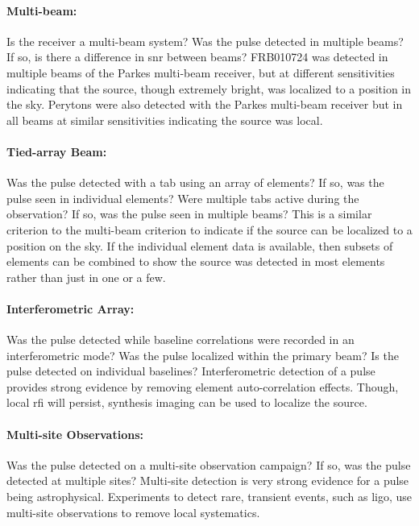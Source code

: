 \documentclass[a4paper,fleqn,usenatbib]{mnras}
\begin{document}
\paragraph{Multi-beam:}

Is the receiver a multi-beam system? Was the pulse detected in multiple beams?
If so, is there a difference in \gls{snr} between beams? FRB010724
\citep{2007Sci...318..777L} was detected in multiple beams of the Parkes
multi-beam receiver, but at different sensitivities indicating that the source,
though extremely bright, was localized to a position in the sky. Perytons were
also detected with the Parkes multi-beam receiver but in all beams at similar
sensitivities indicating the source was local.

\paragraph{Tied-array Beam:}

Was the pulse detected with a \gls{tab} using an array of elements? If so, was
the pulse seen in individual elements? Were multiple \glspl{tab} active during
the observation? If so, was the pulse seen in multiple beams? This is a similar
criterion to the multi-beam criterion to indicate if the source can be localized
to a position on the sky. If the individual element data is available, then
subsets of elements can be combined to show the source was detected in most
elements rather than just in one or a few.

\paragraph{Interferometric Array:}

Was the pulse detected while baseline correlations were recorded in an
interferometric mode? Was the pulse localized within the primary beam? Is the
pulse detected on individual baselines? Interferometric detection of a pulse
provides strong evidence by removing element auto-correlation effects. Though,
local \gls{rfi} will persist, synthesis imaging can be used to localize the
source.

\paragraph{Multi-site Observations:}

Was the pulse detected on a multi-site observation campaign? If so, was the
pulse detected at multiple sites? Multi-site detection is very strong evidence
for a pulse being astrophysical. Experiments to detect rare, transient events,
such as \gls{ligo}, use multi-site observations to remove local systematics.
\end{document}
